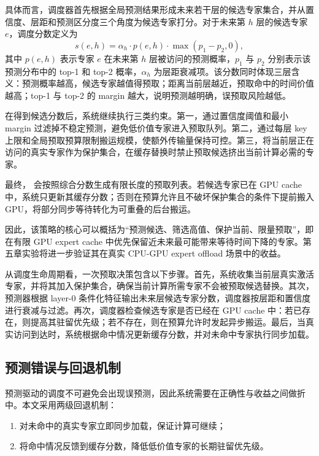 具体而言，调度器首先根据全局预测结果形成未来若干层的候选专家集合，并从置信度、层距和预测区分度三个角度为候选专家打分。对于未来第 $h$ 层的候选专家 $e$，调度分数定义为
\begin{equation}
s(e,h) = \alpha_h \cdot p(e,h) \cdot \max(p_1-p_2,0),
\end{equation}
其中 $p(e,h)$ 表示专家 $e$ 在未来第 $h$ 层被访问的预测概率，$p_1$ 与 $p_2$ 分别表示该预测分布中的 top-1 和 top-2 概率，$\alpha_h$ 为层距衰减项。该分数同时体现三层含义：预测概率越高，候选专家越值得预取；距离当前层越近，预取命中的时间价值越高；top-1 与 top-2 的 margin 越大，说明预测越明确，误预取风险越低。

在得到候选分数后，系统继续执行三类约束。第一，通过置信度阈值和最小 margin 过滤掉不稳定预测，避免低价值专家进入预取队列。第二，通过每层 key 上限和全局预取预算限制搬运规模，使额外传输量保持可控。第三，将当前层正在访问的真实专家作为保护集合，在缓存替换时禁止预取候选挤出当前计算必需的专家。

最终， 会按照综合分数生成有限长度的预取列表。若候选专家已在 GPU cache 中，系统只更新其缓存分数；否则在预算允许且不破坏保护集合的条件下提前搬入 GPU，将部分同步等待转化为可重叠的后台搬运。

因此，该策略的核心可以概括为“预测候选、筛选高值、保护当前、限量预取”，即在有限 GPU expert cache 中优先保留近未来最可能带来等待时间下降的专家。第五章实验将进一步验证其在真实 CPU-GPU expert offload 场景中的收益。

从调度生命周期看，一次预取决策包含以下步骤。首先，系统收集当前层真实激活专家，并将其加入保护集合，确保当前计算所需专家不会被预取候选替换。其次，预测器根据 layer-0 条件化特征输出未来层候选专家分数，调度器按层距和置信度进行衰减与过滤。再次，调度器检查候选专家是否已经在 GPU cache 中：若已存在，则提高其驻留优先级；若不存在，则在预算允许时发起异步搬运。最后，当真实访问到达时，系统根据命中情况更新缓存分数，并对未命中专家执行同步加载。


\subsection{预测错误与回退机制}
预测驱动的调度不可避免会出现误预测，因此系统需要在正确性与收益之间做折中。本文采用两级回退机制：
\begin{enumerate}
    \item 对未命中的真实专家立即同步加载，保证计算可继续；
    \item 将命中情况反馈到缓存分数，降低低价值专家的长期驻留优先级。
\end{enumerate}

